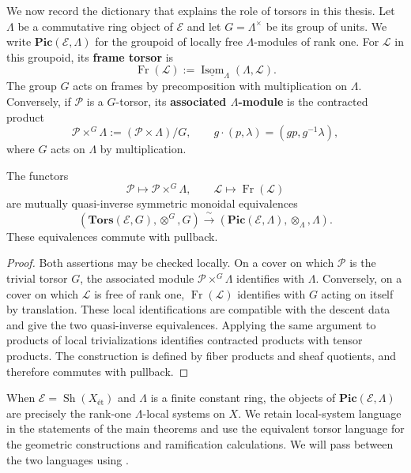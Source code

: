 We now record the dictionary that explains the role of torsors in this thesis.
Let $\Lambda$ be a commutative ring object of $\mathcal{E}$ and let
$G=\Lambda^\times$ be its group of units. We write
$\mathbf{Pic}(\mathcal{E},\Lambda)$ for the groupoid of locally free
$\Lambda$-modules of rank one. For $\mathcal{L}$ in this groupoid, its
\textbf{frame torsor} is
\[
\operatorname{Fr}(\mathcal{L})
  :=\underline{\operatorname{Isom}}_\Lambda(\Lambda,\mathcal{L}).
\]
The group $G$ acts on frames by precomposition with multiplication on $\Lambda$.
Conversely, if $\mathcal{P}$ is a $G$-torsor, its \textbf{associated
$\Lambda$-module} is the contracted product
\[
\mathcal{P}\times^G\Lambda
  :=(\mathcal{P}\times\Lambda)/G,
\qquad
g\cdot(p,\lambda)=(gp,g^{-1}\lambda),
\]
where $G$ acts on $\Lambda$ by multiplication.

\begin{prop}
\label{prop:torsor_module_equivalence}
The functors
\[
\mathcal{P}\longmapsto\mathcal{P}\times^G\Lambda,
\qquad
\mathcal{L}\longmapsto\operatorname{Fr}(\mathcal{L})
\]
are mutually quasi-inverse symmetric monoidal equivalences
\[
(\mathbf{Tors}(\mathcal{E},G),\otimes^G,G)
\xrightarrow{\ \sim\ }
(\mathbf{Pic}(\mathcal{E},\Lambda),\otimes_\Lambda,\Lambda).
\]
These equivalences commute with pullback.
\end{prop}

\begin{proof}
Both assertions may be checked locally. On a cover on which $\mathcal{P}$ is
the trivial torsor $G$, the associated module
$\mathcal{P}\times^G\Lambda$ identifies with $\Lambda$. Conversely, on a
cover on which $\mathcal{L}$ is free of rank one,
$\operatorname{Fr}(\mathcal{L})$ identifies with $G$ acting on itself by
translation. These local identifications are compatible with the descent
data and give the two quasi-inverse equivalences. Applying the same argument
to products of local trivializations identifies contracted products with
tensor products. The construction is defined by fiber products and sheaf
quotients, and therefore commutes with pullback.
\end{proof}

When $\mathcal{E}=\operatorname{Sh}(X_{\text{\'et}})$ and $\Lambda$
is a finite constant ring, the objects of
$\mathbf{Pic}(\mathcal{E},\Lambda)$ are precisely the rank-one
$\Lambda$-local systems on $X$. We retain local-system language in the
statements of the main theorems and use the equivalent torsor language for
the geometric constructions and ramification calculations. We will pass
between the two languages using .


